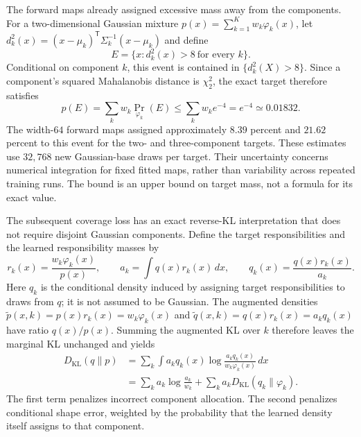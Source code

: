 The forward maps already assigned excessive mass away from the components.
For a two-dimensional Gaussian mixture
$p(x)=\sum_{k=1}^K w_k\varphi_k(x)$, let
$d_k^2(x)=(x-\mu_k)^\mathsf T\Sigma_k^{-1}(x-\mu_k)$ and define
\begin{equation}
 E=\{x:d_k^2(x)>8\ \text{for every }k\}.
\end{equation}
Conditional on component $k$, this event is contained in
$\{d_k^2(X)>8\}$. Since a component's squared Mahalanobis distance is
$\chi^2_2$, the exact target therefore satisfies
\begin{equation}
 p(E)=\sum_k w_k\Pr_{\varphi_k}(E)
 \leq\sum_k w_k e^{-4}=e^{-4}\simeq0.01832.
 \label{eq:neutra-mixture-ellipse-bound}
\end{equation}
The width-$64$ forward maps assigned approximately $8.39$ percent and
$21.62$ percent to this event for the two- and three-component targets.
These estimates use $32{,}768$ new Gaussian-base draws per target. Their
uncertainty concerns numerical integration for fixed fitted maps, rather
than variability across repeated training runs. The bound is an upper
bound on target mass, not a formula for its exact value.

The subsequent coverage loss has an exact reverse-KL interpretation that
does not require disjoint Gaussian components. Define the target
responsibilities and the learned responsibility masses by
\begin{equation}
 r_k(x)=\frac{w_k\varphi_k(x)}{p(x)},\qquad
 a_k=\int q(x)r_k(x)\,dx,\qquad
 q_k(x)=\frac{q(x)r_k(x)}{a_k}.
\end{equation}
Here $q_k$ is the conditional density induced by assigning target
responsibilities to draws from $q$; it is not assumed to be Gaussian.
The augmented densities
$\widetilde p(x,k)=p(x)r_k(x)=w_k\varphi_k(x)$ and
$\widetilde q(x,k)=q(x)r_k(x)=a_kq_k(x)$ have ratio $q(x)/p(x)$.
Summing the augmented KL over $k$ therefore leaves the marginal KL
unchanged and yields
\begin{align}
 D_{\mathrm{KL}}(q\|p)
 &=\sum_k\int a_kq_k(x)
       \log\frac{a_kq_k(x)}{w_k\varphi_k(x)}\,dx\\
 &=\sum_k a_k\log\frac{a_k}{w_k}
   +\sum_k a_kD_{\mathrm{KL}}(q_k\|\varphi_k).
 \label{eq:neutra-responsibility-kl-decomposition}
\end{align}
The first term penalizes incorrect component allocation. The second
penalizes conditional shape error, weighted by the probability that the
learned density itself assigns to that component.

